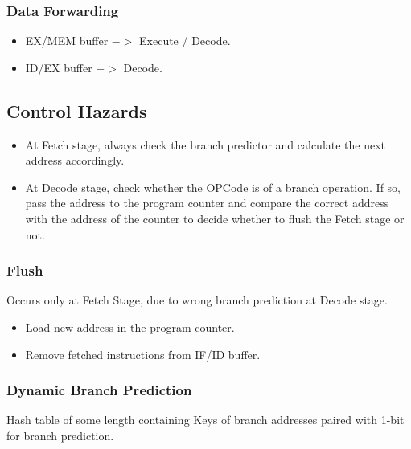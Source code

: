 \documentclass[12pt]{report}
\begin{document}
\subsubsection{Data Forwarding}
\begin{itemize}
    \item EX/MEM buffer $->$ Execute / Decode.
    \item ID/EX buffer $->$ Decode.
\end{itemize}

\subsection{Control Hazards}
\begin{itemize}
    \item At Fetch stage, always check the branch predictor and calculate the next address accordingly.
    \item At Decode stage, check whether the OPCode is of a branch operation. If so, pass the address to the program counter and compare the correct address with the address of the counter to decide whether to flush the Fetch stage or not. 
\end{itemize}

\subsubsection{Flush}
Occurs only at Fetch Stage, due to wrong branch prediction at Decode stage.
\begin{itemize}
    \item Load new address in the program counter.
    \item Remove fetched instructions from IF/ID buffer.
\end{itemize}

\subsubsection{Dynamic Branch Prediction}
Hash table of some length containing Keys of branch addresses paired with 1-bit for branch prediction.
\end{document}
